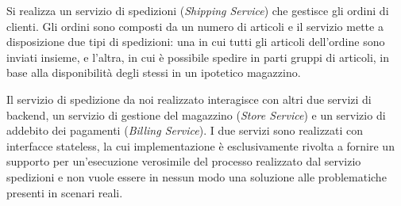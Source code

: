 Si realizza un servizio di spedizioni (\emph{Shipping Service}) che gestisce
gli ordini di clienti. Gli ordini sono composti da un numero di
articoli e il servizio mette a disposizione due tipi di spedizioni: una in cui
tutti gli articoli dell'ordine sono inviati insieme, e l'altra, in cui è
possibile spedire in parti gruppi di articoli, in base alla disponibilità degli stessi in
un ipotetico magazzino.

Il servizio di spedizione da noi realizzato interagisce con altri due servizi
di backend, un servizio di gestione del magazzino (\emph{Store Service}) e un
servizio di addebito dei pagamenti (\emph{Billing Service}). I due servizi
sono realizzati con interfacce stateless, la cui implementazione è
esclusivamente rivolta a fornire un supporto per un'esecuzione verosimile del
processo realizzato dal servizio spedizioni e non vuole essere in nessun modo
una soluzione alle problematiche presenti in scenari reali.

